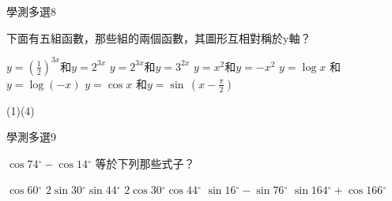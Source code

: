 \begin{QUESTIONS}
    \begin{QUESTION}
        \begin{ExamInfo}{84}{學測}{多選}{8}
        \end{ExamInfo}
        \begin{ExamAnsRateInfo}{}{}{}{}
        \end{ExamAnsRateInfo}
        \begin{QBODY}
            下面有五組函數，那些組的兩個函數，其圖形互相對稱於y軸？
            \begin{QOPS}
            \QOP $y={{\left( \frac{1}{2} \right)}^{3x}}$和$y={{2}^{3x}}$
            \QOP $y={{2}^{3x}}$和$y={{3}^{2x}}$
            \QOP $y={{x}^{2}}$和$y=-{{x}^{2}}$
            \QOP $y=\log x$ 和$y=\log \left( -x \right)$ 
            \QOP $y=\cos x$ 和$y=\sin \,\left( x-\frac{\pi }{2} \right)$ 
        \end{QOPS}
        \end{QBODY}
        \begin{QFROMS}
        \end{QFROMS}
        \begin{QTAGS}\end{QTAGS}
        \begin{QANS}
            (1)(4)
        \end{QANS}
        \begin{QSOLLIST}
        \end{QSOLLIST}
        \begin{QEMPTYSPACE}
        \end{QEMPTYSPACE}
    \end{QUESTION}
    \begin{QUESTION}
        \begin{ExamInfo}{84}{學測}{多選}{9}
        \end{ExamInfo}
        \begin{ExamAnsRateInfo}{}{}{}{}
        \end{ExamAnsRateInfo}
        \begin{QBODY}
            $ \cos 74{}^\circ -\cos 14{}^\circ  $ 等於下列那些式子？
            \begin{QOPS}
            \QOP $\cos 60{}^\circ  $ 
            \QOP $2\sin 30{}^\circ \sin 44{}^\circ  $ 
            \QOP $2\cos 30{}^\circ \cos 44{}^\circ  $ 
            \QOP $\sin 16{}^\circ -\sin 76{}^\circ  $ 
            \QOP $\sin 164{}^\circ +\cos 166{}^\circ $  
        \end{QOPS}
    


\end{QBODY}
\end{QUESTION}
\end{QUESTIONS}
